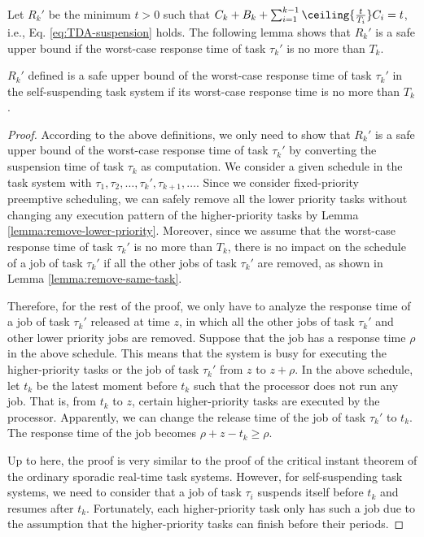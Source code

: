 Let $R_k'$ be the minimum $t > 0$ such that  $C_k + B_k + \sum_{i=1}^{k-1}\ceiling{\frac{t}{T_i}} C_i = t$, i.e., Eq. \ref{eq:TDA-suspension} holds. The following lemma shows that $R_k'$ is a safe upper bound if the worst-case response time of task $\tau_k'$ is no more than $T_k$.

\begin{lemma}
\label{lemma:critical}
 $R_k'$ defined is a safe upper bound of the worst-case response time of task $\tau_k'$ in the self-suspending task system if its worst-case response time is no more than $T_k$.
\end{lemma}
\begin{proof}
According to the above definitions, we only need to show that $R_k'$ is a safe upper bound of the worst-case response time of task $\tau_k'$ by converting the suspension time of task $\tau_k$ as computation. We consider a given schedule in the task system with $\tau_1, \tau_2, \ldots, \tau_k', \tau_{k+1}, \ldots$. Since we consider fixed-priority preemptive scheduling, we can safely remove all the lower priority tasks without changing any execution pattern of the higher-priority tasks by Lemma \ref{lemma:remove-lower-priority}. Moreover, since we assume that the worst-case response time of task $\tau_k'$ is no more than $T_k$, there is no impact on the schedule of a job of task $\tau_k'$ if all the other jobs of task $\tau_k'$ are removed, as shown in Lemma \ref{lemma:remove-same-task}. 


Therefore, for the rest of the proof, we only have to analyze the response time of a job of task $\tau_k'$ released at time $z$, in which all the other jobs of task $\tau_k'$ and other lower priority jobs are removed. Suppose that the job has a response time $\rho$ in the above schedule. This means that the system is busy for executing the higher-priority tasks or the job of task $\tau_k'$ from $z$ to $z+\rho$. In the above schedule, let $t_{k}$ be the latest moment before $t_k$ such that the processor does not run any job. That is, from $t_k$ to $z$, certain higher-priority tasks are executed by the processor. Apparently, we can change the release time of the job of task $\tau_k'$ to $t_k$. The response time of the job becomes $\rho+z-t_k \geq \rho$. 

Up to here, the proof is very similar to the proof of the critical instant theorem of the ordinary sporadic real-time task systems. However, for self-suspending task systems, we need to consider that a job of task $\tau_i$ suspends itself before $t_k$ and resumes after $t_k$.  Fortunately, each higher-priority task only has such a job due to the assumption that the higher-priority tasks can finish before their periods. 


\end{proof}
